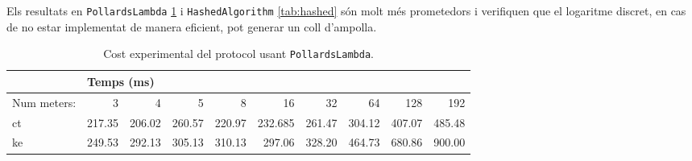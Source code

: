 Els resultats en \texttt{PollardsLambda} \ref{tab:pollards} i \texttt{HashedAlgorithm} \ref{tab:hashed} són molt més prometedors i verifiquen que el logaritme discret, en cas de no estar implementat de manera eficient, pot generar un coll d'ampolla.
\begin{table}[H]
	\centering
	\begin{tabular}{lrrrrrrrrr}
		\centering
		&\multicolumn{9}{l}{\centering Temps (ms)}\\
		\toprule
		Num meters: &           3  &       4  &           5  &            8  &              16  &         32  &         64  &      128 &     192 \\
		\midrule
		ct &  217.35 &  206.02 &  260.57 &  220.97 &  232.685 &  261.47 &  304.12&  407.07 &  485.48 \\
		ke &  249.53&  292.13&  305.13&  310.13&  297.06&  328.20 &  464.73&  680.86&  900.00 \\
		\bottomrule
	\end{tabular}
	\caption{Cost experimental del protocol usant \texttt{PollardsLambda}.}
	\label{tab:pollards}
\end{table}

